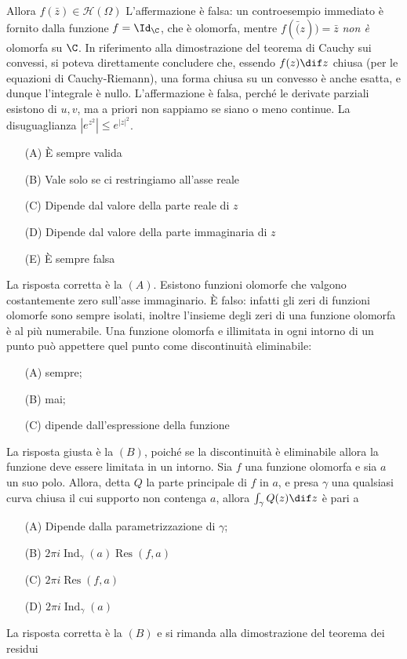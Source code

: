     Allora $f(\bar{z}) \in \mathcal{H}(\Omega)$
    L'affermazione è falsa: un controesempio immediato è fornito dalla funzione $ f=\Id_{\C} $, che è olomorfa, mentre $ f(\bar(z))=\bar{z} $ \emph{non è} olomorfa su $ \C $.
    In riferimento alla dimostrazione del teorema di Cauchy sui convessi, si poteva direttamente concludere che, essendo $f(z)\dif z$ chiusa (per le equazioni di Cauchy-Riemann), una forma chiusa su un convesso è anche esatta, e dunque l'integrale è nullo.
    L'affermazione è falsa, perché le derivate parziali esistono di $u, v$, ma a priori non sappiamo se siano o meno continue.
    La disuguaglianza $|e^{z^2}| \leq e^{|z|^2}$.
    \begin{itemize}
        \item[(A)] È sempre valida
        \item[(B)] Vale solo se ci restringiamo all'asse reale
        \item[(C)] Dipende dal valore della parte reale di $z$
        \item[(D)] Dipende dal valore della parte immaginaria di $z$
        \item[(E)] È sempre falsa
    \end{itemize}
    La risposta corretta è la $ (A) $.
    Esistono funzioni olomorfe che valgono costantemente zero sull'asse immaginario.
    È falso: infatti gli zeri di funzioni olomorfe sono sempre isolati, inoltre l'insieme degli zeri di una funzione olomorfa è al più numerabile.
    Una funzione olomorfa e illimitata in ogni intorno di un punto può appettere quel punto come discontinuità eliminabile: \begin{itemize}
        \item[(A)] sempre; 
        \item[(B)] mai; 
        \item[(C)] dipende dall'espressione della funzione
    \end{itemize}
    La risposta giusta è la $ (B) $, poiché se la discontinuità è eliminabile allora la funzione deve essere limitata in un intorno. 
    Sia $f$ una funzione olomorfa e sia $a$ un suo polo. Allora, detta $Q$ la parte principale di $f$ in $a$, e presa $\gamma$ una qualsiasi curva chiusa il cui supporto non contenga $a$, allora $\int_{\gamma} Q(z) \dif z$ è pari a \begin{itemize}
        \item[(A)] Dipende dalla parametrizzazione di $\gamma$;
        \item[(B)] $2\pi i \operatorname{Ind}_{\gamma}(a) \operatorname{Res}(f,a)$
        \item[(C)] $2\pi i \operatorname{Res}(f,a)$
        \item[(D)] $2\pi i \operatorname{Ind}_{\gamma}(a)$
    \end{itemize}
    La risposta corretta è la $(B)$ e si rimanda alla dimostrazione del teorema dei residui

